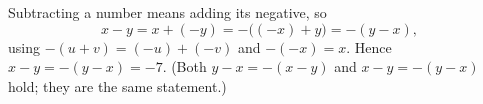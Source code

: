 Subtracting a number means adding its negative, so
\[
x-y=x+(-y)=-\big((-x)+y\big)=-(y-x),
\]
using $-(u+v)=(-u)+(-v)$ and $-(-x)=x$. Hence $x-y=-(y-x)=\boxed{-7}$. (Both $y-x=-(x-y)$ and $x-y=-(y-x)$ hold; they are the same statement.)
